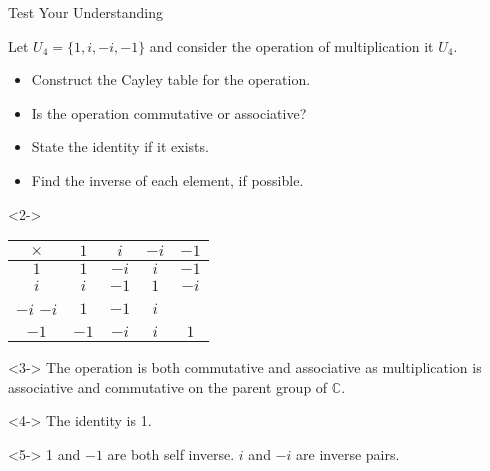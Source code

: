 \documentclass[8pt]{beamer}
\begin{document}
\begin{frame}{Test Your Understanding}
	\begin{problem}
		Let $U_{4}=\{1,i,-i,-1\}$ and consider the operation of multiplication it $ U_4$.
		\begin{itemize}
			\item  Construct the Cayley table for the operation.
			\item Is the operation commutative or associative?
			\item State the identity if it exists.
			\item Find the inverse of each element, if possible.

		\end{itemize}
	\end{problem}
\begin{solution}<2->
	
		\begin{center}
			\colorbox{cc!30}{
			\setlength\arrayrulewidth{0.5mm}
			\begin{tabular}{c|cccc}
				$\times $ & $1$ & $i$ & $-i$ & $-1$ \\
				\hline
				$1$ & $1$ & $-i$ & $i$ & $-1$ \\
				$i$ & $i$ & $-1$ & $1$ & $-i$ \\
				$-i$ $-i$  & $1$ & $-1$ & $i$ \\
				$-1$ & $-1$ & $-i$ & $i$ & $1$ \\
			\end{tabular}
		}
		\end{center}
\end{solution}	
\begin{solution}<3->
	The operation is both commutative and associative as multiplication is associative and commutative on the parent group of $\mathbb{C}.$
\end{solution}
\begin{solution}<4->
	The identity is 1.
	
\end{solution}
\begin{solution}<5->
	1 and  $-1$ are both self inverse. $i$ and  $-i$ are inverse pairs.
\end{solution}
\end{frame}
\end{document}
